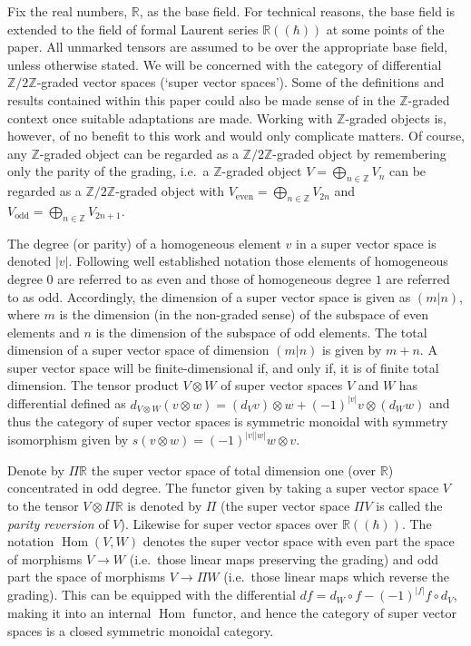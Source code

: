 \documentclass[]{amsart}
\theoremstyle{definition}
\newcommand{\Hom}{\operatorname{Hom}}
\begin{document}
Fix the real numbers, $\mathbb{R}$, as the base field. For technical reasons, the base field is extended to the field of formal Laurent series $\mathbb{R}((\hbar))$ at some points of the paper. All unmarked tensors are assumed to be over the appropriate base field, unless otherwise stated. We will be concerned with the category of differential $\mathbb{Z}/2\mathbb{Z}$-graded vector spaces (`super vector spaces'). Some of the definitions and results contained within this paper could also be made sense of in the $\mathbb{Z}$-graded context once suitable adaptations are made. Working with $\mathbb{Z}$-graded objects is, however, of no benefit to this work and would only complicate matters. Of course, any $\mathbb{Z}$-graded object can be regarded as a $\mathbb{Z}/2\mathbb{Z}$-graded object by remembering only the parity of the grading, i.e.~a $\mathbb{Z}$-graded object $V=\bigoplus_{n\in\mathbb{Z}} V_n$ can be regarded as a $\mathbb{Z}/2\mathbb{Z}$-graded object with $V_{\text{even}}=\bigoplus_{n\in \mathbb{Z}} V_{2n}$ and $V_{\text{odd}}=\bigoplus_{n\in \mathbb{Z}} V_{2n+1}$.

The degree (or parity) of a homogeneous element $v$ in a super vector space is denoted $|v|$. Following well established notation those elements of homogeneous degree $0$ are referred to as even and those of homogeneous degree $1$ are referred to as odd. Accordingly, the dimension of a super vector space is given as $(m|n)$, where $m$ is the dimension (in the non-graded sense) of the subspace of even elements and $n$ is the dimension of the subspace of odd elements. The total dimension of a super vector space of dimension $(m|n)$ is given by $m+n$. A super vector space will be finite-dimensional if, and only if, it is of finite total dimension. The tensor product $V\otimes W$ of super vector spaces $V$ and $W$ has differential defined as $d_{V\otimes W}(v \otimes w)=(d_V v)\otimes w + (-1)^{|v|}v\otimes (d_W w)$ and thus the category of super vector spaces is symmetric monoidal with symmetry isomorphism given by $s(v\otimes w) = (-1)^{|v||w|}w\otimes v$.

Denote by $\Pi \mathbb{R}$ the super vector space of total dimension one (over $\mathbb{R}$) concentrated in odd degree. The functor given by taking a super vector space $V$ to the tensor $V\otimes \Pi \mathbb{R}$ is denoted by $\Pi$ (the super vector space $\Pi V$ is called the \emph{parity reversion} of $V$). Likewise for super vector spaces over $\mathbb{R}((\hbar))$. The notation $\Hom(V, W)$ denotes the super vector space with even part the space of morphisms $V \to W$ (i.e.\ those linear maps preserving the grading) and odd part the space of morphisms $V \to \Pi W$ (i.e.\ those linear maps which reverse the grading). This can be equipped with the differential $df=d_W \circ f - (-1)^{|f|}f \circ d_V$, making it into an internal $\Hom$ functor, and hence the category of super vector spaces is a closed symmetric monoidal category.
\end{document}
